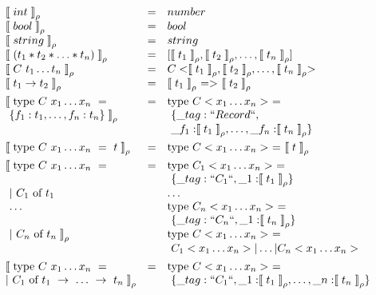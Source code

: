 \begin{center}
$
\begin{array}{lll}
\llpar int \rrpar _{\rho} &=& number \\ 
\llpar bool \rrpar _{\rho} &=& bool \\ 
\llpar string \rrpar _{\rho}  &=& string \\ 
\llpar (t_1 * t_2 * \ldots * t_n) \rrpar _{\rho}  &=& [\llpar t_1 \rrpar _{\rho}, \llpar t_2 \rrpar _{\rho}, \ldots, \llpar t_n \rrpar _{\rho}] \\ 
\llpar C ~ t_1 \ldots t_n \rrpar _{\rho} &=& C<\llpar t_1 \rrpar _{\rho}, \llpar t_2 \rrpar _{\rho}, \ldots, \llpar t_n \rrpar _{\rho}>\\
\llpar t_1 \to t_2 \rrpar _{\rho} &=& \llpar t_1 \rrpar_{\rho}  ~=>~ \llpar t_2 \rrpar _{\rho} \\[1ex]

\llpar \mbox{type}~C~x_1 \ldots x_n ~=~ &=& \mbox{type}~C<x_1 \ldots x_n>~=\\ 
~\{f_1:t_1, \ldots, f_n:t_n\} \rrpar _{\rho} & & ~\{ \_tag: ``Record``,\\ 
& & ~ \_f_1:\llpar t_1 \rrpar _{\rho}, \ldots,\_f_n:\llpar t_n \rrpar _{\rho} \} \\[1ex] 

\llpar \mbox{type}~C~x_1 \ldots x_n ~=~t\rrpar _{\rho} &=& \mbox{type}~C<x_1 \ldots x_n>~=~\llpar t \rrpar _{\rho} \\[1ex] 

\llpar \mbox{type}~C~x_1 \ldots x_n ~= &=& \mbox{type}~C_1<x_1 \ldots x_n>~=~ \\ & & ~\{ \_tag: ``C_1``, \_1:\llpar t_1 \rrpar _{\rho} \} \\
  ~|~C_1~\mbox{of}~t_1 & & \ldots \\
  ~\ldots & & \mbox{type}~C_n<x_1 \ldots x_n>~=~ \\ & & ~\{ \_tag: ``C_n``, \_1:\llpar t_n \rrpar _{\rho} \} \\
  ~|~C_n~\mbox{of}~t_n \rrpar _{\rho} & &\mbox{type}~C<x_1 \ldots x_n>~=~\\ & & ~C_1<x_1 \ldots x_n>|\ldots|C_n<x_1 \ldots x_n>\\[1ex]

\llpar \mbox{type}~C~x_1 \ldots x_n ~=&=& \mbox{type}~C<x_1 \ldots x_n>~=\\ 
|~ C_1~\mbox{of}~t_1~\to~\ldots~\to~t_n \rrpar _{\rho} & & ~\{ \_tag: ``C_1``, \_1:\llpar t_1 \rrpar _{\rho}, \ldots, \_n:\llpar t_n \rrpar _{\rho} \} 
\end{array}
$
\captionsetup{type=lstlisting}
\label{tbl:tr_types}
\end{center}


